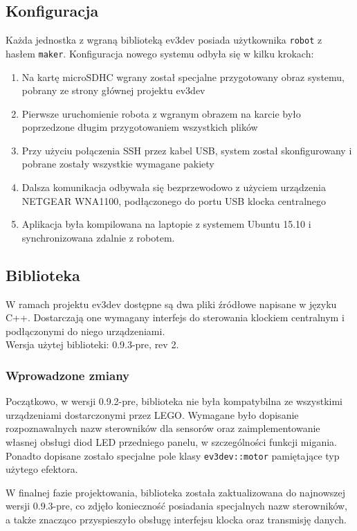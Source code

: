 \subsection{Konfiguracja}

Każda jednostka z wgraną biblioteką ev3dev posiada użytkownika {\tt robot} z hasłem {\tt maker}. Konfiguracja nowego systemu odbyła się w kilku krokach:

\begin{enumerate}
    \item Na kartę microSDHC wgrany został specjalne przygotowany obraz systemu, pobrany ze strony głównej projektu ev3dev
    \item Pierwsze uruchomienie robota z wgranym obrazem na karcie było poprzedzone długim przygotowaniem wszystkich plików
    \item Przy użyciu połączenia SSH przez kabel USB, system został skonfigurowany i pobrane zostały wszystkie wymagane pakiety
    \item Dalsza komunikacja odbywała się bezprzewodowo z użyciem urządzenia NETGEAR WNA1100, podłączonego do portu USB klocka centralnego
    \item Aplikacja była kompilowana na laptopie z systemem Ubuntu 15.10 i synchronizowana zdalnie z robotem.
\end{enumerate}

\subsection{Biblioteka}
W ramach projektu ev3dev dostępne są dwa pliki źródłowe napisane w języku C++. Dostarczają one wymagany interfejs do sterowania klockiem centralnym i\,podłączonymi do niego urządzeniami.\\

\noindent Wersja użytej biblioteki: 0.9.3-pre, rev 2.

\subsubsection{Wprowadzone zmiany}
Początkowo, w wersji 0.9.2-pre, biblioteka nie była kompatybilna ze wszystkimi urządzeniami dostarczonymi przez LEGO. Wymagane było dopisanie rozpoznawalnych nazw sterowników dla sensorów oraz zaimplementowanie własnej obsługi diod LED przedniego panelu, w szczególności funkcji migania. Ponadto dopisane zostało specjalne pole klasy {\tt ev3dev::motor} pamiętające typ użytego efektora.

W finalnej fazie projektowania, biblioteka została zaktualizowana do najnowszej wersji 0.9.3-pre, co zdjęło konieczność posiadania specjalnych nazw sterowników, a także znacząco przyspieszyło obsługę interfejsu klocka oraz transmisję danych.

